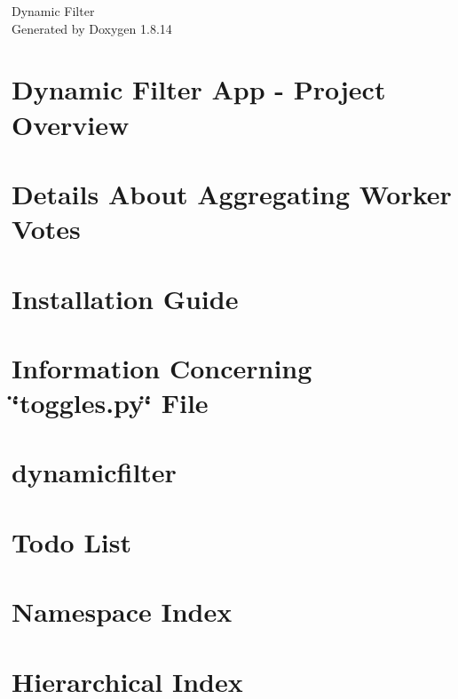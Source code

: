 \documentclass[twoside]{book}
\newcommand{\+}{\discretionary{\mbox{\scriptsize$\hookleftarrow$}}{}{}}
\newcommand{\clearemptydoublepage}{%
  \newpage{\pagestyle{empty}\cleardoublepage}%
}
\begin{document}
\hypersetup{pageanchor=false,
             bookmarksnumbered=true,
             pdfencoding=unicode
            }
\begin{titlepage}
\vspace*{7cm}
\begin{center}%
{\Large Dynamic Filter }\\
\vspace*{1cm}
{\large Generated by Doxygen 1.8.14}\\
\end{center}
\end{titlepage}
\clearemptydoublepage
{}
\tableofcontents
\clearemptydoublepage
{}
\hypersetup{pageanchor=true}

\chapter{Dynamic Filter App -\/ Project Overview}
\label{index}\hypertarget{index}{}
\chapter{Details About Aggregating Worker Votes}
\label{con_info}

\chapter{Installation Guide}
\label{install_info}

\chapter{Information Concerning \char`\"{}toggles.\+py\char`\"{} File}
\label{toggles}

\chapter{dynamicfilter}
\label{md__r_e_a_d_m_e}

\chapter{Todo List}
\label{todo}

\chapter{Namespace Index}

\chapter{Hierarchical Index}

\end{document}
